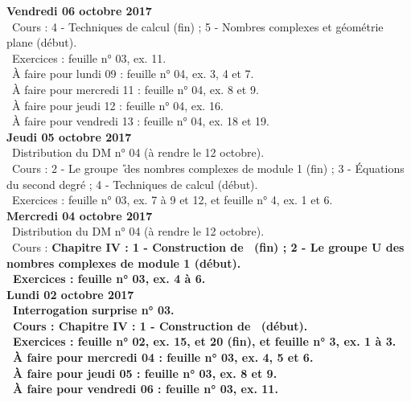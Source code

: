 \documentclass[12pt,a4paper]{article}
\begin{document}
\noindent\textbf{Vendredi 06 octobre 2017}\\
\bu\ Cours : 4 - Techniques de calcul (fin) ; 5 - Nombres complexes et géométrie plane (début).\\
\bu\ Exercices : feuille n° 03, ex. 11.\\
\bu\ À faire pour lundi 09 : feuille n° 04, ex. 3, 4 et 7.\\
\bu\ À faire pour mercredi 11 : feuille n° 04, ex. 8 et 9.\\
\bu\ À faire pour jeudi 12 : feuille n° 04, ex. 16.\\
\bu\ À faire pour vendredi 13 : feuille n° 04, ex. 18 et 19.\vspace{.4cm}\\

\noindent\textbf{Jeudi 05 octobre 2017}\\
\bu\ Distribution du DM n° 04 (à rendre le 12 octobre).\\
\bu\ Cours : 2 - Le groupe \U\ des nombres complexes de module 1 (fin) ; 3 - Équations du second degré ; 4 - Techniques 
de calcul (début).\\
\bu\ Exercices : feuille n° 03, ex. 7 à 9 et 12, et feuille n° 4, ex. 1 et 6.\vspace{.4cm}\\

\noindent\textbf{\bf Mercredi 04 octobre 2017}\\
\bu\ Distribution du DM n° 04 (à rendre le 12 octobre).\\
\bu\ Cours : \bf Chapitre IV \rm : 1 - Construction de \C\ (fin) ; 2 - Le groupe \textbf{U} des nombres 
complexes de module 1 (début).\\
\bu\ Exercices : feuille n° 03, ex. 4 à 6.\vspace{.4cm}\\

\noindent\textbf{\bf Lundi 02 octobre 2017}\\
\bu\ Interrogation surprise n° 03.\\
\bu\ Cours : \bf Chapitre IV \rm : 1 - Construction de \C\ (début).\\
\bu\ Exercices : feuille n° 02, ex. 15, et 20 (fin), et feuille n° 3, ex. 1 à 3.\\
\bu\ À faire pour mercredi 04 : feuille n° 03, ex. 4, 5 et 6.\\
\bu\ À faire pour jeudi 05 : feuille n° 03, ex. 8 et 9.\\
\bu\ À faire pour vendredi 06 : feuille n° 03, ex. 11.\vspace{.4cm}\\
\end{document}
